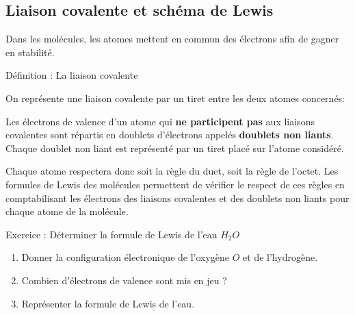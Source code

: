\documentclass[french]{article}
\begin{document}
\subsection{Liaison covalente et schéma de Lewis}

Dans les molécules, les atomes mettent en commun des électrons afin de gagner en stabilité.

\begin{definition}{Définition : La liaison covalente}
\bigskip

\dotfill \bigskip

\dotfill
\end{definition}
On représente une liaison covalente par un tiret entre les deux atomes concernés:
\begin{center}
\hspace{3cm} \hspace{3cm} 
\end{center}

Les électrons de valence d'un atome qui \textbf{ne participent pas} aux liaisons covalentes sont répartis en doublets d'électrons appelés \textbf{doublets non liants}. Chaque doublet non liant est représenté par un tiret placé sur l'atome considéré.

\begin{center}
\end{center}


Chaque atome respectera donc soit la règle du duet, soit la règle de l'octet. Les formules de Lewis des molécules permettent de vérifier le respect de ces règles en comptabilisant les électrons des liaisons covalentes et des doublets non liants pour chaque atome de la molécule.

\begin{Exercice}{Exercice : Déterminer la formule de Lewis de l'eau $H_2O$}
\begin{enumerate}
	\item Donner la configuration électronique de l'oxygène $O$ et de l'hydrogène.
	\item Combien d'électrons de valence sont mis en jeu ? 
	\item Représenter la formule de Lewis de l'eau.
\end{enumerate}

\end{Exercice}
\end{document}
